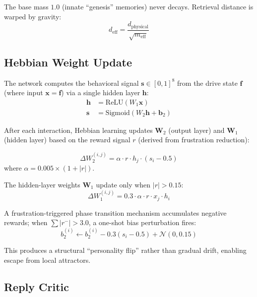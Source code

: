 \noindent The base mass $1.0$ (innate ``genesis'' memories) never decays. Retrieval distance is warped by gravity:
\begin{equation}
  d_{\text{eff}} = \frac{d_{\text{physical}}}{\sqrt{m_{\text{eff}}}}
\end{equation}

\subsection{Hebbian Weight Update}

The network computes the behavioral signal $\mathbf{s} \in [0,1]^8$ from the drive state $\mathbf{f}$ (where input $\mathbf{x} = \mathbf{f}$) via a single hidden layer $\mathbf{h}$:
\begin{align}
  \mathbf{h} &= \text{ReLU}(W_1 \mathbf{x}) \\
  \mathbf{s} &= \text{Sigmoid}(W_2 \mathbf{h} + \mathbf{b}_2)
\end{align}

\noindent After each interaction, Hebbian learning updates $\mathbf{W}_2$ (output layer) and $\mathbf{W}_1$ (hidden layer) based on the reward signal $r$ (derived from frustration reduction):

\begin{equation}
  \Delta W_{2}^{(i,j)} = \alpha \cdot r \cdot h_j \cdot (s_i {-} 0.5)
\end{equation}
where $\alpha = 0.005 \times (1 + |r|)$.

\noindent The hidden-layer weights $\mathbf{W}_1$ update only when $|r| > 0.15$:
\begin{equation}
  \Delta W_{1}^{(i,j)} = 0.3 \cdot \alpha \cdot r \cdot x_j \cdot h_i
\end{equation}

\noindent A frustration-triggered phase transition mechanism accumulates negative rewards; when $\sum |r^-| > 3.0$, a one-shot bias perturbation fires:
\begin{equation}
  b_{2}^{(i)} \leftarrow b_{2}^{(i)} - 0.3(s_i - 0.5) + \mathcal{N}(0, 0.15)
\end{equation}

\noindent This produces a structural ``personality flip'' rather than gradual drift, enabling escape from local attractors.

\subsection{Reply Critic}

